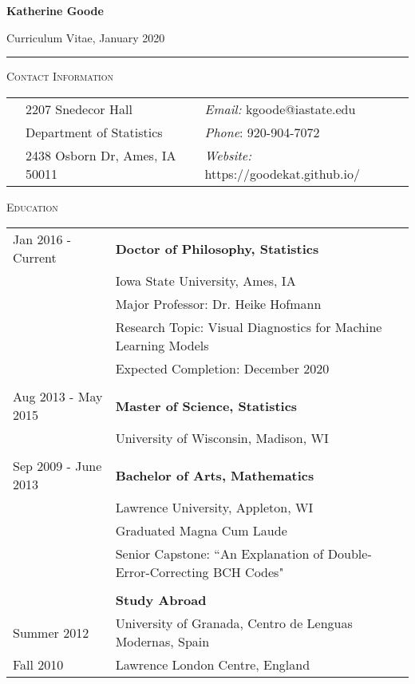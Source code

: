 \documentclass[10pt, oneside]{article}
\begin{document}
\begin{LARGE} \noindent\textbf{Katherine Goode} \end{LARGE} \hfill Curriculum Vitae, January 2020\\
\rule{\textwidth}{1pt}

\vspace{0.25cm}

\noindent \textsc{Contact Information} \hrulefill
\begin{longtable}{p{3.9cm}p{6.5cm}p{6.5cm}}
& 2207 Snedecor Hall & \emph{Email:} kgoode@iastate.edu\\
& Department of Statistics & \emph{Phone}: 920-904-7072\\
& 2438 Osborn Dr, Ames, IA 50011 & \emph{Website:} https://goodekat.github.io/
\end{longtable}

\noindent \textsc{Education} \hrulefill
\begin{longtable}{p{3.5cm}p{13cm}}
\hfill{Jan 2016 - Current} & \textbf{Doctor of Philosophy, Statistics}\\
& Iowa State University, Ames, IA\\
& Major Professor: Dr. Heike Hofmann\\
& Research Topic: Visual Diagnostics for Machine Learning Models\\
& Expected Completion: December 2020\\
\\
\hfill{Aug 2013 - May 2015} & \textbf{Master of Science, Statistics}\\
& University of Wisconsin, Madison, WI\\
\\
\hfill{Sep 2009 - June 2013} & \textbf{Bachelor of Arts, Mathematics}\\
& Lawrence University, Appleton, WI\\
& Graduated Magna Cum Laude\\
& Senior Capstone: ``An Explanation of Double-Error-Correcting BCH Codes"\\
\\
& \textbf{Study Abroad}\\
\hfill{Summer 2012} & \indent University of Granada, Centro de Lenguas Modernas, Spain\\
\hfill{Fall 2010} & \indent Lawrence London Centre, England
\end{longtable}
\end{document}
